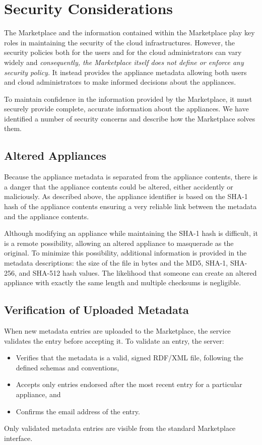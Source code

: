 \section{Security Considerations}
\label{sec:security}

The Marketplace and the information contained within the Marketplace
play key roles in maintaining the security of the cloud
infrastructures.  However, the security policies both for the users
and for the cloud administrators can vary widely and {\em
  consequently, the Marketplace itself does not define or enforce any
  security policy.}  It instead provides the appliance metadata
allowing both users and cloud administrators to make informed
decisions about the appliances.

To maintain confidence in the information provided by the Marketplace,
it must securely provide complete, accurate information about the
appliances.  We have identified a number of security concerns and
describe how the Marketplace solves them. 

\subsection{Altered Appliances}

Because the appliance metadata is separated from the appliance
contents, there is a danger that the appliance contents could be
altered, either accidently or maliciously.  As described above, the
appliance identifier is based on the SHA-1 hash of the appliance
contents ensuring a very reliable link between the metadata and the
appliance contents.

Although modifying an appliance while maintaining the SHA-1 hash is
difficult, it is a remote possibility, allowing an altered appliance
to masquerade as the original.  To minimize this possibility,
additional information is provided in the metadata descriptions: the
size of the file in bytes and the MD5, SHA-1, SHA-256, and SHA-512
hash values.  The likelihood that someone can create an altered
appliance with exactly the same length and multiple checksums is
negligible.

\subsection{Verification of Uploaded Metadata}

When new metadata entries are uploaded to the Marketplace, the service
validates the entry before accepting it.  To validate an entry, the
server:
\begin{itemize}
\item Verifies that the metadata is a valid, signed RDF/XML file,
  following the defined schemas and conventions,
\item Accepts only entries endorsed after the most recent entry for a
  particular appliance, and 
\item Confirms the email address of the entry.
\end{itemize}
Only validated metadata entries are visible from the standard
Marketplace interface.

